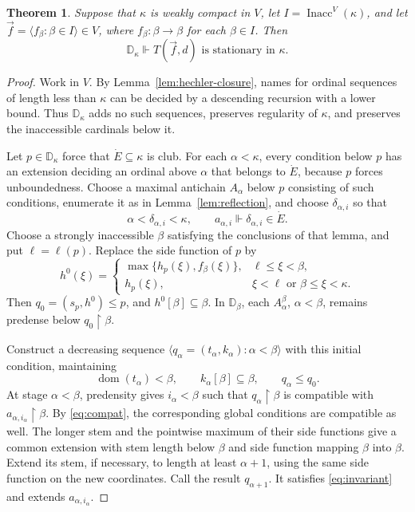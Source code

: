 \documentclass[11pt,a4paper]{amsart}
\newtheorem{theorem}{Theorem}[section]
\theoremstyle{definition}
\theoremstyle{remark}
\newcommand{\D}{\mathbb D}
\DeclareMathOperator{\dom}{dom}
\DeclareMathOperator{\Inacc}{Inacc}
\begin{document}
\begin{theorem}\label{thm:domination}
Suppose that \(\kappa\) is weakly compact in \(V\), let
\(I=\Inacc^V(\kappa)\), and let
\(\vec f=\langle f_\beta:\beta\in I\rangle\in V\), where
\(f_\beta:\beta\to\beta\) for each \(\beta\in I\). Then
\[
 \D_\kappa\Vdash
 T(\vec f,d)\text{ is stationary in }\kappa.
\]
\end{theorem}
\begin{proof}
Work in \(V\). By Lemma~\ref{lem:hechler-closure}, names for
ordinal sequences of length less than \(\kappa\) can be decided
by a descending recursion with a lower bound. Thus \(\D_\kappa\)
adds no such sequences, preserves regularity of \(\kappa\), and
preserves the inaccessible cardinals below it.

Let \(p\in\D_\kappa\) force that \(\dot E\subseteq\kappa\)
is club. For each \(\alpha<\kappa\), every condition below
\(p\) has an extension deciding an ordinal above \(\alpha\)
that belongs to \(\dot E\), because \(p\) forces unboundedness.
Choose a maximal antichain
\(A_\alpha\) below \(p\) consisting of such conditions, enumerate
it as in Lemma~\ref{lem:reflection}, and choose
\(\delta_{\alpha,i}\) so that
\[
 \alpha<\delta_{\alpha,i}<\kappa,\qquad
 a_{\alpha,i}\Vdash\delta_{\alpha,i}\in\dot E.
\]
Choose a strongly inaccessible \(\beta\) satisfying the conclusions
of that lemma, and put \(\ell=\ell(p)\). Replace the side function
of \(p\) by
\[
 h^0(\xi)=
 \begin{cases}
 \max\{h_p(\xi),f_\beta(\xi)\},&\ell\leq\xi<\beta,\\
 h_p(\xi),&\xi<\ell\text{ or }\beta\leq\xi<\kappa.
 \end{cases}
\]
Then \(q_0=(s_p,h^0)\leq p\), and
\(h^0[\beta]\subseteq\beta\). In \(\D_\beta\), each
\(A_\alpha^\beta\), \(\alpha<\beta\), remains predense below
\(q_0\restriction\beta\).

Construct a decreasing sequence
\(\langle q_\alpha=(t_\alpha,k_\alpha):\alpha<\beta\rangle\)
with this initial condition, maintaining
\begin{equation}\label{eq:invariant}
 \dom(t_\alpha)<\beta,\qquad
 k_\alpha[\beta]\subseteq\beta,\qquad q_\alpha\leq q_0.
\end{equation}
At stage \(\alpha<\beta\), predensity gives \(i_\alpha<\beta\)
such that \(q_\alpha\restriction\beta\) is compatible with
\(a_{\alpha,i_\alpha}\restriction\beta\). By
\eqref{eq:compat}, the corresponding global conditions are
compatible as well. The longer stem and the pointwise maximum of their
side functions give a common extension with stem length below
\(\beta\) and side function mapping \(\beta\) into \(\beta\).
Extend its stem, if necessary, to
length at least \(\alpha+1\), using the same side function on
the new coordinates. Call the result \(q_{\alpha+1}\). It
satisfies \eqref{eq:invariant} and extends
\(a_{\alpha,i_\alpha}\).


\end{proof}
\end{document}
